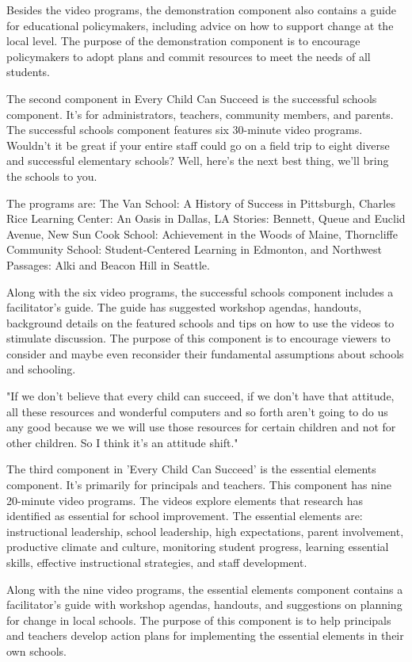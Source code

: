 Besides the video programs, the demonstration component also contains a guide for educational policymakers, including advice on how to support change at the local level.
The purpose of the demonstration component is to encourage policymakers to adopt plans and commit resources to meet the needs of all students.

The second component in Every Child Can Succeed is the successful schools component.
It's for administrators, teachers, community members, and parents.
The successful schools component features six 30-minute video programs.
Wouldn't it be great if your entire staff could go on a field trip to eight diverse and successful elementary schools?
Well, here's the next best thing, we'll bring the schools to you.

The programs are: The Van School: A History of Success in Pittsburgh, Charles Rice Learning Center: An Oasis in Dallas, LA Stories: Bennett, Queue and Euclid Avenue, New Sun Cook School: Achievement in the Woods of Maine, Thorncliffe Community School: Student-Centered Learning in Edmonton, and Northwest Passages: Alki and Beacon Hill in Seattle.

Along with the six video programs, the successful schools component includes a facilitator's guide.
The guide has suggested workshop agendas, handouts, background details on the featured schools and tips on how to use the videos to stimulate discussion.
The purpose of this component is to encourage viewers to consider and maybe even reconsider their fundamental assumptions about schools and schooling.

"If we don't believe that every child can succeed, if we don't have that attitude, all these resources and wonderful computers and so forth aren't going to do us any good because we we will use those resources for certain children and not for other children.
So I think it's an attitude shift."

The third component in 'Every Child Can Succeed' is the essential elements component.
It's primarily for principals and teachers.
This component has nine 20-minute video programs.
The videos explore elements that research has identified as essential for school improvement.
The essential elements are: instructional leadership, school leadership, high expectations, parent involvement, productive climate and culture, monitoring student progress, learning essential skills, effective instructional strategies, and staff development.

Along with the nine video programs, the essential elements component contains a facilitator's guide with workshop agendas, handouts, and suggestions on planning for change in local schools.
The purpose of this component is to help principals and teachers develop action plans for implementing the essential elements in their own schools.

